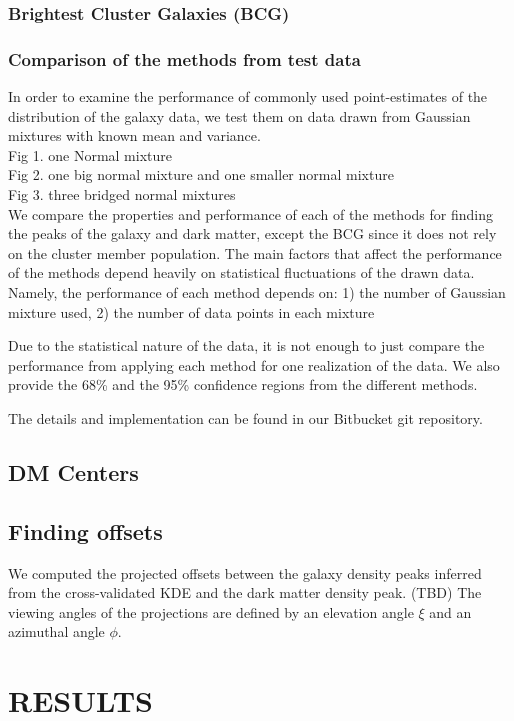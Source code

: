 \documentclass[letterpaper,useAMS,usenatbib]{mn2e}
\begin{document}
\subsubsection{Brightest Cluster Galaxies (BCG)}

\subsubsection{Comparison of the methods from test data}
In order to examine the performance of commonly used point-estimates of the
distribution of the galaxy data, we test them on data drawn from Gaussian mixtures with
known mean and variance. \\
Fig 1. one Normal mixture \\  
Fig 2. one big normal mixture and one smaller normal mixture \\ 
Fig 3. three bridged normal mixtures \\  
We compare the properties and performance of each of the
methods for finding the peaks of the galaxy and dark matter, 
except the BCG since it does not rely on the cluster member population. 
The main factors that affect the performance of the methods depend heavily on
statistical fluctuations of the drawn data. Namely, the performance of each
method depends on: 1) the
number of Gaussian mixture used, 2) the number of data points in each mixture

Due to the statistical nature of the data, it is not enough to just
compare the performance from applying each method for one realization of the
data. We also provide the 68\% and the 95\% confidence regions from the different methods.


The details and implementation can be found in our Bitbucket git repository.



\subsection{DM Centers}
\subsection{Finding offsets} 

We computed the projected offsets between the galaxy density peaks inferred from the
cross-validated KDE and the dark matter density peak. (TBD) 
The viewing angles of the projections are defined by an elevation angle
$\xi$ and an azimuthal angle $\phi$. 


\section{RESULTS} 
\end{document}
